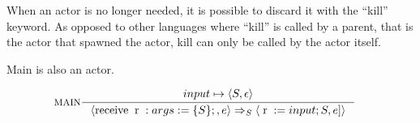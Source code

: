 When an actor is no longer needed, it is possible to discard it with the \enquote{kill} keyword. As opposed to other languages where \enquote{kill} is called by a parent, that is the actor that spawned the actor, kill can only be called by the actor itself. 


Main is also an actor.


\begin{align*}
&\inference[$\text{MAIN}$]{input \mapsto \Braket{S,\epsilon}}
                          {\Braket{\Treceive \Tr:args := \{S\};,e} \Rightarrow_S \Braket{\Tr := input;S, e]}}
\end{align*}